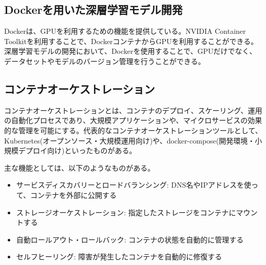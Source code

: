 \documentclass{ltjsarticle}
\begin{document}
\subsection{Dockerを用いた深層学習モデル開発}
Dockerは、GPUを利用するための機能を提供している。NVIDIA Container Toolkitを利用することで、DockerコンテナからGPUを利用することができる。深層学習モデルの開発において、Dockerを使用することで、GPUだけでなく、データセットやモデルのバージョン管理を行うことができる。

\subsection{コンテナオーケストレーション}
コンテナオーケストレーションとは、コンテナのデプロイ、スケーリング、運用の自動化プロセスであり、大規模アプリケーションや、マイクロサービスの効果的な管理を可能にする。代表的なコンテナオーケストレーションツールとして、Kubernetes(オープンソース・大規模運用向け)や、docker-compose(開発環境・小規模デプロイ向け)といったものがある。
\par
主な機能としては、以下のようなものがある。
\begin{itemize}
  \item サービスディスカバリーとロードバランシング: DNS名やIPアドレスを使って、コンテナを外部に公開する
  \item ストレージオーケストレーション: 指定したストレージをコンテナにマウントする
  \item 自動ロールアウト・ロールバック: コンテナの状態を自動的に管理する
  \item セルフヒーリング: 障害が発生したコンテナを自動的に修復する
\end{itemize}
\end{document}
